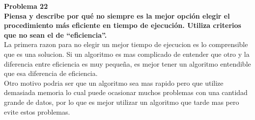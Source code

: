 \documentclass[a4paper]{article}
\begin{document}
\textbf{Problema 22\\
Piensa y describe por qué no siempre es la mejor opción elegir el procedimiento más eficiente en tiempo de ejecución. Utiliza criterios que no sean el de “eficiencia”.}\\
La primera razon para no elegir un mejor tiempo de ejecucion es lo comprensible que es una solucion. Si un algoritmo es mas complicado de entender que otro y la diferencia entre eficiencia es muy pequeña, es mejor tener un algoritmo entendible que esa diferencia de eficiencia.\\
Otro motivo podria ser que un algoritmo sea mas rapido pero que utilize demasiada memoria lo cual puede ocasionar muchos problemas con una cantidad grande de datos, por lo que es mejor utilizar un algoritmo que tarde mas pero evite estos problemas.
\end{document}
